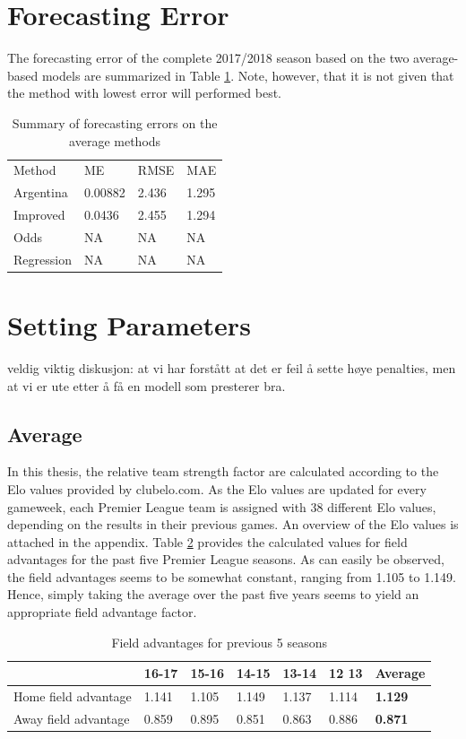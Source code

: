 \section{Forecasting Error}

The forecasting error of the complete 2017/2018 season based on the two average-based models are summarized in Table \ref{tab:accuracy_average}. Note, however, that it is not given that the method with lowest error will performed best. 

\begin{table}[H]
\centering
\caption{Summary of forecasting errors on the average methods}
\label{tab:accuracy_average}
\begin{tabular}{llll}
Method & ME & RMSE & MAE\\
Argentina & 0.00882 & 2.436 & 1.295 \\
Improved  & 0.0436  & 2.455 & 1.294 \\ 
Odds  & NA  & NA & NA   \\
Regression  & NA  & NA & NA \\
\end{tabular}
\end{table}


\section{Setting Parameters}
veldig viktig diskusjon: 
at vi har forstått at det er feil å sette høye penalties, men at vi er ute etter å få en modell som presterer bra. 


\subsection{Average}
In this thesis, the relative team strength factor are calculated according to the Elo values provided by clubelo.com. As the Elo values are updated for every gameweek, each Premier League team is assigned with 38 different Elo values, depending on the results in their previous games. An overview of the Elo values is attached in the appendix. 
\newpar
Table \ref{Field advantage} provides the calculated values for field advantages for the past five Premier League seasons. As can easily be observed, the field advantages seems to be somewhat constant, ranging from 1.105 to 1.149. Hence, simply taking the average over the past five years seems to yield an appropriate field advantage factor. 

\begin{table}[H]
\centering
\caption{Field advantages for previous 5 seasons}
\label{Field advantage}
\begin{tabular}{|l|l|l|l|l|l|l|}
\hline
          & 16-17    & 15-16    & 14-15    & 13-14    & 12 13 & \textbf{Average}   \\
          \hline
        
Home field advantage & 1.141 & 1.105 & 1.149 & 1.137 & 1.114 & \textbf{1.129} \\
\hline
Away field advantage & 0.859 & 0.895 & 0.851 & 0.863 & 0.886 & \textbf{0.871} \\
\hline
\end{tabular}
\end{table}

